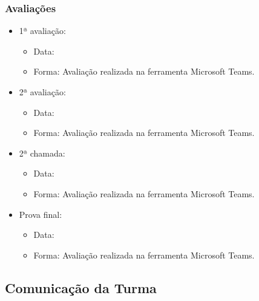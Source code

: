 \begin{frame}[t]\frametitle{Avaliações}

  \begin{itemize}
    \justifying{}
    \setlength\itemsep{1em}
    \item 1ª avaliação:
    \begin{itemize}
      \justifying{}
      \item Data:
      \item Forma: Avaliação realizada na ferramenta Microsoft Teams.
    \end{itemize}
    \item 2ª avaliação:
    \begin{itemize}
      \justifying{}
      \item Data:
      \item Forma: Avaliação realizada na ferramenta Microsoft Teams.
    \end{itemize}
    \item 2ª chamada:
    \begin{itemize}
      \justifying{}
      \item Data:
      \item Forma: Avaliação realizada na ferramenta Microsoft Teams.
    \end{itemize}
    \item Prova final:
    \begin{itemize}
      \justifying{}
      \item Data:
      \item Forma: Avaliação realizada na ferramenta Microsoft Teams.
    \end{itemize}
  \end{itemize}

\end{frame}



\subsection[Comunicação da Turma]{Comunicação da Turma}\label{subsec:sec03-comunicacao-turma}



